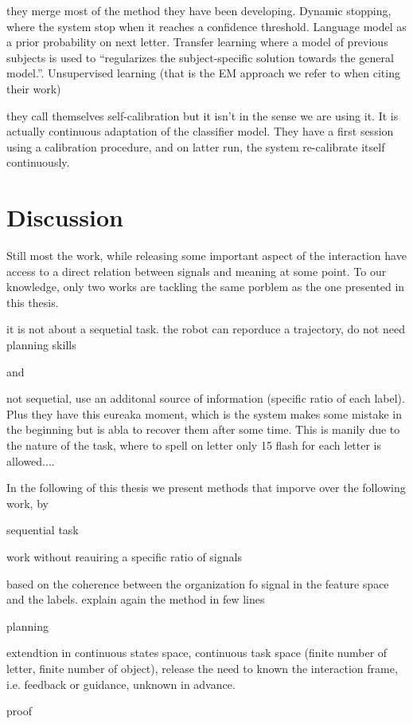 \cite{kindermans2014integrating} they merge most of the method they have been developing. Dynamic stopping, where the system stop when it reaches a confidence threshold. Language model as a prior probability on next letter. Transfer learning where a model of previous subjects is used to ``regularizes the subject-specific solution towards the general model.''. Unsupervised learning (that is the EM approach we refer to when citing their work)

\cite{schettini2014self} they call themselves self-calibration but it isn't in the sense we are using it. It is actually continuous adaptation of the classifier model. They have a first session using a calibration procedure, and on latter run, the system re-calibrate itself continuously.

\section{Discussion}

Still most the work, while releasing some important aspect of the interaction have access to a direct relation between signals and meaning at some point. To our knowledge, only two works are tackling the same porblem as the one presented in this thesis.

 
\cite{cederborg2011imitating}
it is not about a sequetial task. the robot can reporduce a trajectory, do not need planning skills

and

\cite{Kindermans2012a,Kindermans2012b,kindermans2014integrating} not sequetial, use an additonal source of information (specific ratio of each label). Plus they have this eureaka moment, which is the system makes some mistake in the beginning but is abla to recover them after some time. This is manily due to the nature of the task, where to spell on letter only 15 flash for each letter is allowed....

In the following of this thesis we present methods that imporve over the following work, by

sequential task

work without reauiring a specific ratio of signals

based on the coherence between the organization fo signal in the feature space and the labels. explain again the method in few lines

planning

extendtion in continuous states space, continuous task space (finite number of letter, finite number of object), release the need to known the interaction frame, i.e. feedback or guidance, unknown in advance.

proof


